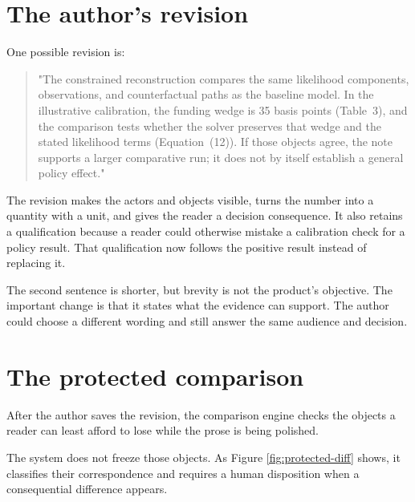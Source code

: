 \section{The author's revision}

One possible revision is:

\begin{quote}\small
"The constrained reconstruction compares the same likelihood components,
observations, and counterfactual paths as the baseline model. In the
illustrative calibration, the funding wedge is 35 basis points (Table~3), and
the comparison tests whether the solver preserves that wedge and the stated
likelihood terms (Equation~(12)). If those objects agree, the note supports a
larger comparative run; it does not by itself establish a general policy
effect."
\end{quote}

The revision makes the actors and objects visible, turns the number into a
quantity with a unit, and gives the reader a decision consequence. It also
retains a qualification because a reader could otherwise mistake a calibration
check for a policy result. That qualification now follows the positive result
instead of replacing it.

\begin{repairpair}
\end{repairpair}

The second sentence is shorter, but brevity is not the product's objective. The
important change is that it states what the evidence can support. The author
could choose a different wording and still answer the same audience and
decision.

\section{The protected comparison}

After the author saves the revision, the comparison engine checks the objects a
reader can least afford to lose while the prose is being polished.

The system does not freeze those objects. As Figure
\ref{fig:protected-diff} shows, it classifies their correspondence and requires
a human disposition when a consequential difference appears.


